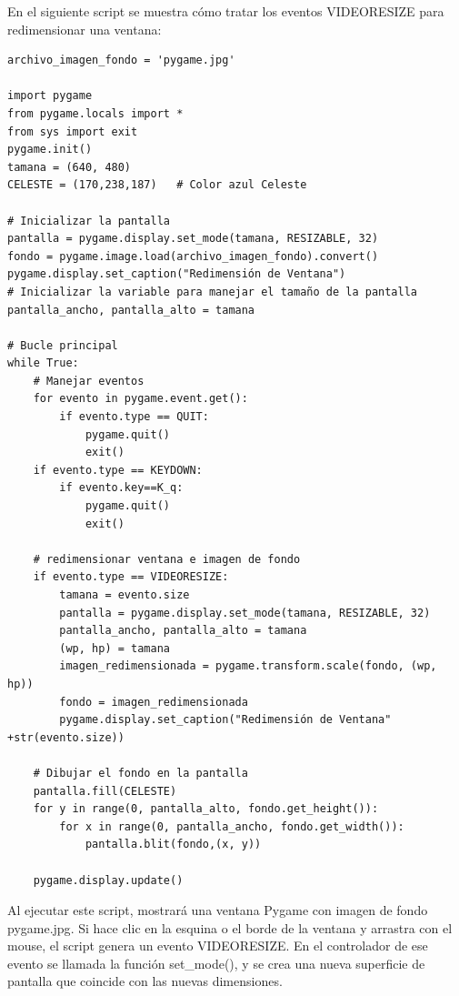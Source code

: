 En el siguiente {\ttfamily script} se muestra cómo tratar los eventos {\ttfamily VIDEORESIZE} para redimensionar una ventana:


\hspace{-2.65cm}{\ttfamily \scriptsize redimens}

\vspace{-0.2cm}
\hspace{-2.7cm}{\ttfamily \scriptsize \_ventana.py}\vspace{-0.84cm}
\begin{lstlisting}		
archivo_imagen_fondo = 'pygame.jpg'

import pygame
from pygame.locals import *
from sys import exit
pygame.init()
tamana = (640, 480)
CELESTE = (170,238,187)   # Color azul Celeste 

# Inicializar la pantalla
pantalla = pygame.display.set_mode(tamana, RESIZABLE, 32)
fondo = pygame.image.load(archivo_imagen_fondo).convert()
pygame.display.set_caption("Redimensión de Ventana")
# Inicializar la variable para manejar el tamaño de la pantalla
pantalla_ancho, pantalla_alto = tamana

# Bucle principal
while True:
    # Manejar eventos
    for evento in pygame.event.get():
        if evento.type == QUIT:
            pygame.quit()
            exit()    
    if evento.type == KEYDOWN: 
        if evento.key==K_q:
            pygame.quit()
            exit()
            
    # redimensionar ventana e imagen de fondo
    if evento.type == VIDEORESIZE:
        tamana = evento.size
        pantalla = pygame.display.set_mode(tamana, RESIZABLE, 32)
        pantalla_ancho, pantalla_alto = tamana
        (wp, hp) = tamana
        imagen_redimensionada = pygame.transform.scale(fondo, (wp, hp))
        fondo = imagen_redimensionada
        pygame.display.set_caption("Redimensión de Ventana" +str(evento.size))

    # Dibujar el fondo en la pantalla
    pantalla.fill(CELESTE)    
    for y in range(0, pantalla_alto, fondo.get_height()):       
        for x in range(0, pantalla_ancho, fondo.get_width()):            
            pantalla.blit(fondo,(x, y)) 

    pygame.display.update()
\end{lstlisting}	


Al ejecutar este {\ttfamily script}, mostrará una ventana  Pygame con  
imagen de fondo {\ttfamily pygame.jpg}. Si hace clic en la esquina o el borde de la ventana y arrastra con el mouse, 
el {\ttfamily script} genera un evento {\ttfamily VIDEORESIZE}.  
En el controlador de ese evento se llamada la función {\ttfamily set\_mode()}, y se crea
una nueva superficie de pantalla que coincide con las nuevas dimensiones. 

